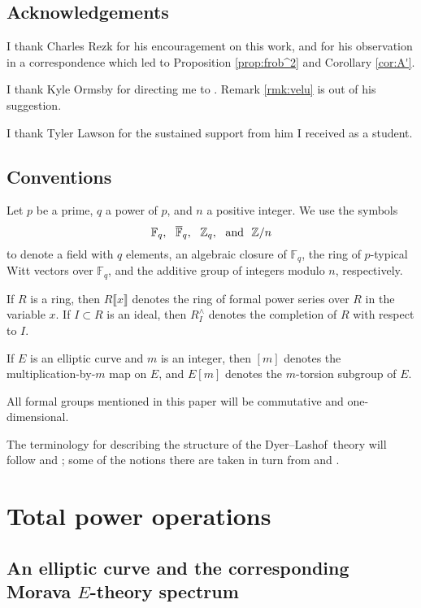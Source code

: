 \documentclass{gtpart}
\theoremstyle{definition}
\theoremstyle{remark}
\newcommand{\mb}[1]{\mathbb{#1}}
\newcommand{\cF}{\overline {\mb F}}
\newcommand{\DL}{Dyer--Lashof~}
\newcommand{\BF}{{\mb F}}
\newcommand{\BZ}{{\mb Z}}
\newcommand{\ad}{{\rm and}}
\begin{document}
\subsection{Acknowledgements}

I thank Charles Rezk for his encouragement on this work, and for his observation in a correspondence which led to Proposition \ref{prop:frob^2} and Corollary \ref{cor:A'}.  

I thank Kyle Ormsby for directing me to \cite{kohel}.  Remark \ref{rmk:velu} is out of his suggestion.  

I thank Tyler Lawson for the sustained support from him I received as a student.  


\subsection{Conventions}

Let $p$ be a prime, $q$ a power of $p$, and $n$ a positive integer.  We use the symbols 
\[
 \BF_q,~~\cF_q,~~\BZ_q,~~\ad~~\BZ/n 
\]
to denote a field with $q$ elements, an algebraic closure of $\BF_q$, the ring of $p$-typical Witt vectors over $\BF_q$, 
and the additive group of integers modulo $n$, respectively.  

If $R$ is a ring, then $R\llbracket x \rrbracket$ denotes the ring of formal power series over $R$ in the variable $x$.  
If $I \subset R$ is an ideal, then $R_I^\wedge$ denotes the completion of $R$ with respect to $I$.  

If $E$ is an elliptic curve and $m$ is an integer, then $[m]$ denotes the multiplication-by-$m$ map on $E$, and $E[m]$ denotes the $m$-torsion subgroup of $E$.  

All formal groups mentioned in this paper will be commutative and one-dimensional.  

The terminology for describing the structure of the \DL theory will follow \cite{cong} and \cite{h2p2}; 
some of the notions there are taken in turn from \cite{BW} and \cite{V}.  


\section{Total power operations}
\label{sec:total}

\subsection{An elliptic curve and the corresponding Morava $E$-theory spectrum}
\end{document}
